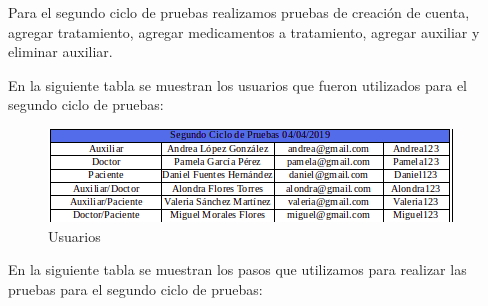 Para el segundo ciclo de pruebas realizamos pruebas de creación de cuenta, agregar tratamiento, agregar medicamentos a tratamiento, agregar auxiliar y eliminar auxiliar.

En la siguiente tabla se muestran los usuarios que fueron utilizados para el segundo ciclo de pruebas:

\begin{figure}[!htbp]			
	\hypertarget{fig:usuarios2}{\hspace{1pt}}
	\begin{center}
		\includegraphics[height=0.17\textheight]{Pruebas/images/Usuarios2}
		\caption{Usuarios}
		\label{fig:usuarios2}
	\end{center}
\end{figure}


En la siguiente tabla se muestran los pasos que utilizamos para realizar las pruebas para el segundo ciclo de pruebas:

